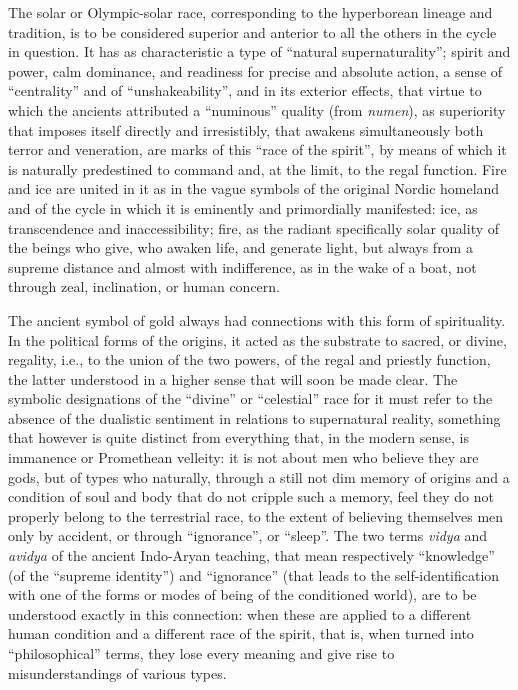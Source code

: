 The solar or Olympic-solar race, corresponding to the hyperborean lineage and tradition, is to be considered superior and anterior to all the others in the cycle in question. It has as characteristic a type of ``natural supernaturality''; spirit and power, calm dominance, and readiness for precise and absolute action, a sense of ``centrality'' and of ``unshakeability'', and in its exterior effects, that virtue to which the ancients attributed a ``numinous'' quality (from \emph{numen}), as superiority that imposes itself directly and irresistibly, that awakens simultaneously both terror and veneration, are marks of this ``race of the spirit'', by means of which it is naturally predestined to command and, at the limit, to the regal function. Fire and ice are united in it as in the vague symbols of the original Nordic homeland and of the cycle in which it is eminently and primordially manifested: ice, as transcendence and inaccessibility; fire, as the radiant specifically solar quality of the beings who give, who awaken life, and generate light, but always from a supreme distance and almost with indifference, as in the wake of a boat, not through zeal, inclination, or human concern.

The ancient symbol of gold always had connections with this form of spirituality. In the political forms of the origins, it acted as the substrate to sacred, or divine, regality, i.e., to the union of the two powers, of the regal and priestly function, the latter understood in a higher sense that will soon be made clear. The symbolic designations of the ``divine'' or ``celestial'' race for it must refer to the absence of the dualistic sentiment in relations to supernatural reality, something that however is quite distinct from everything that, in the modern sense, is immanence or Promethean velleity: it is not about men who believe they are gods, but of types who naturally, through a still not dim memory of origins and a condition of soul and body that do not cripple such a memory, feel they do not properly belong to the terrestrial race, to the extent of believing themselves men only by accident, or through ``ignorance'', or ``sleep''. The two terms \emph{vidya} and \emph{avidya} of the ancient Indo-Aryan teaching, that mean respectively ``knowledge'' (of the ``supreme identity'') and ``ignorance'' (that leads to the self-identification with one of the forms or modes of being of the conditioned world), are to be understood exactly in this connection: when these are applied to a different human condition and a different race of the spirit, that is, when turned into ``philosophical'' terms, they lose every meaning and give rise to misunderstandings of various types.

